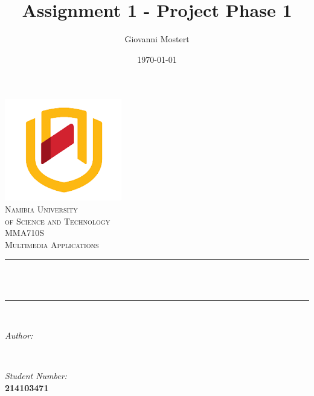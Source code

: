 \documentclass[a4paper,12pt]{article}
\title{Assignment 1 - Project Phase 1}								%
\author{Giovanni Mostert}								      %
\date{\today}											      %
\makeatletter
\let\thetitle\@title
\let\theauthor\@author
\let\thedate\@date
\makeatother
\begin{document}

\begin{titlepage}
	\centering
    \vspace*{0.5 cm}
    \includegraphics[scale = 0.75]{NUST.png}\\[0.5 cm]	            %
    \textsc{\LARGE Namibia University}\\[0.4 cm]
    \textsc{\LARGE of Science and Technology}\\[2.0 cm]	            %
	\textsc{\Large MMA710S}\\[0.5 cm]				      %
	\textsc{\large Multimedia Applications}\\[0.5 cm]				      %
	\rule{\linewidth}{0.2 mm} \\[0.4 cm]
	{ \huge \bfseries \thetitle}\\
	\rule{\linewidth}{0.2 mm} \\[1.5 cm]

	\begin{minipage}{0.4\textwidth}
		\begin{flushleft} \large
			\emph{Author:}\\
			{\bfseries \theauthor}
			\end{flushleft}
			\end{minipage}~
			\begin{minipage}{0.4\textwidth}
			\begin{flushright} \large
			\emph{Student Number:} \\
			{\bfseries 214103471}									%
		\end{flushright}
	\end{minipage}\\[2 cm]

	{\large \thedate}\\[2 cm]

	\vfill

\end{titlepage}
\end{document}
